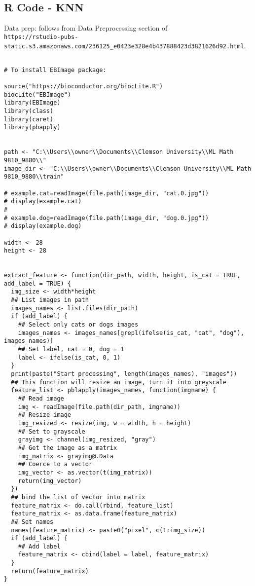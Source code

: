 \documentclass[12pt]{article}
\newcommand{\<}{\langle}
\renewcommand{\>}{\rangle}
\theoremstyle{definition}
\begin{document}
\subsection*{R Code - KNN}
Data prep: follows from Data Preprocessing section of \\
\small{
\verb|https://rstudio-pubs-static.s3.amazonaws.com/236125_e0423e328e4b437888423d3821626d92.html|.
}


\begin{verbatim}

# To install EBImage package:

source("https://bioconductor.org/biocLite.R")
biocLite("EBImage")
library(EBImage)
library(class)
library(caret)
library(pbapply)


path <- "C:\\Users\\owner\\Documents\\Clemson University\\ML Math 9810_9880\\"
image_dir <- "C:\\Users\\owner\\Documents\\Clemson University\\ML Math 9810_9880\\train"

# example.cat=readImage(file.path(image_dir, "cat.0.jpg"))
# display(example.cat)
# 
# example.dog=readImage(file.path(image_dir, "dog.0.jpg"))
# display(example.dog)

width <- 28
height <- 28


extract_feature <- function(dir_path, width, height, is_cat = TRUE, add_label = TRUE) {
  img_size <- width*height
  ## List images in path
  images_names <- list.files(dir_path)
  if (add_label) {
    ## Select only cats or dogs images
    images_names <- images_names[grepl(ifelse(is_cat, "cat", "dog"), images_names)]
    ## Set label, cat = 0, dog = 1
    label <- ifelse(is_cat, 0, 1)
  }
  print(paste("Start processing", length(images_names), "images"))
  ## This function will resize an image, turn it into greyscale
  feature_list <- pblapply(images_names, function(imgname) {
    ## Read image
    img <- readImage(file.path(dir_path, imgname))
    ## Resize image
    img_resized <- resize(img, w = width, h = height)
    ## Set to grayscale
    grayimg <- channel(img_resized, "gray")
    ## Get the image as a matrix
    img_matrix <- grayimg@.Data
    ## Coerce to a vector
    img_vector <- as.vector(t(img_matrix))
    return(img_vector)
  })
  ## bind the list of vector into matrix
  feature_matrix <- do.call(rbind, feature_list)
  feature_matrix <- as.data.frame(feature_matrix)
  ## Set names
  names(feature_matrix) <- paste0("pixel", c(1:img_size))
  if (add_label) {
    ## Add label
    feature_matrix <- cbind(label = label, feature_matrix)
  }
  return(feature_matrix)
}


\end{verbatim}
\end{document}
